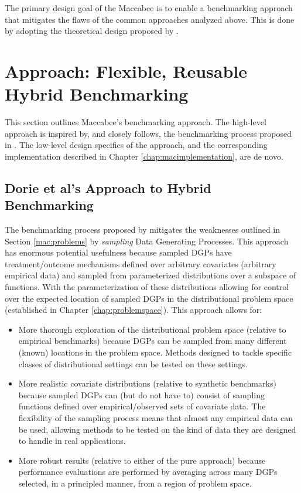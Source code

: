 \documentclass[../main.tex]{subfiles}
\begin{document}
\vspace{\baselineskip}

The primary design goal of the Maccabee is to enable a benchmarking approach that mitigates the flaws of the common approaches analyzed above. This is done by adopting the theoretical design proposed by \textcite{Dorie2019Automated1}.

\section{Approach: Flexible, Reusable Hybrid Benchmarking}
\label{mac:approach}

This section outlines Maccabee's benchmarking approach. The high-level approach is inspired by, and closely follows, the benchmarking process proposed in \textcite{Dorie2019Automated1}. The low-level design specifics of the approach, and the corresponding implementation described in Chapter \ref{chap:macimplementation}, are de novo.

\subsection{Dorie et al's Approach to Hybrid Benchmarking}
\label{mac:generalapproach}

The benchmarking process proposed by \textcite{Dorie2019Automated1} mitigates the weaknesses outlined in Section \ref{mac:problems} by \textit{sampling} Data Generating Processes. This approach has enormous potential usefulness because sampled DGPs have treatment/outcome mechanisms defined over arbitrary covariates (arbitrary empirical data) and sampled from parameterized distributions over a subspace of functions. With the parameterization of these distributions allowing for control over the expected location of sampled DGPs in the distributional problem space (established in Chapter \ref{chap:problemspace}). This approach allows for:

\begin{itemize}
    \item More thorough exploration of the distributional problem space (relative to empirical benchmarks) because DGPs can be sampled from many different (known) locations in the problem space. Methods designed to tackle specific classes of distributional settings can be tested on these settings.

    \item More realistic covariate distributions (relative to synthetic benchmarks) because sampled DGPs can (but do not have to) consist of sampling functions defined over empirical/observed sets of covariate data. The flexibility of the sampling process means that almost any empirical data can be used, allowing methods to be tested on the kind of data they are designed to handle in real applications.

    \item More robust results (relative to either of the pure approach) because performance evaluations are performed by averaging across many DGPs selected, in a principled manner, from a region of problem space.
\end{itemize}
\end{document}
